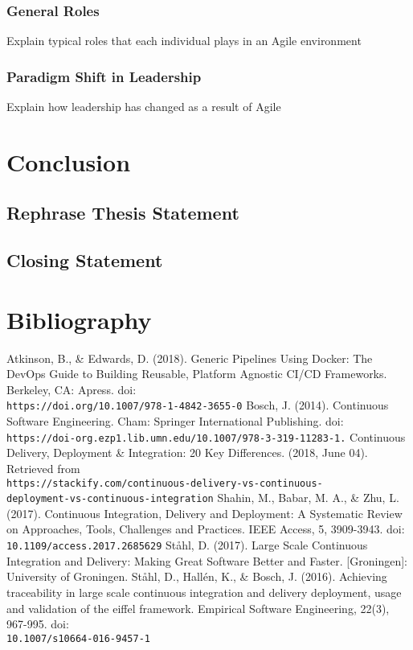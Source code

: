 \documentclass[11pt,a4paper]{article}
\begin{document}
		\subsubsection{General Roles}
		Explain typical roles that each individual plays in an Agile environment
		\subsubsection{Paradigm Shift in Leadership}
		Explain how leadership has changed as a result of Agile

\section{Conclusion}
	\subsection{Rephrase Thesis Statement}
	\subsection{Closing Statement}

\newpage
\section{Bibliography}
\begin{thebibliography}{6}
	 Atkinson, B., \& Edwards, D. (2018). Generic Pipelines Using Docker: The DevOps Guide to Building Reusable, Platform Agnostic CI/CD Frameworks. Berkeley, CA: Apress. doi:\\\texttt{https://doi.org/10.1007/978-1-4842-3655-0}
	 Bosch, J. (2014). Continuous Software Engineering. Cham: Springer International Publishing. doi:\\\texttt{https://doi-org.ezp1.lib.umn.edu/10.1007/978-3-319-11283-1.}
	 Continuous Delivery, Deployment \& Integration: 20 Key Differences. (2018, June 04). Retrieved from \\\texttt{https://stackify.com/continuous-delivery-vs-continuous-\\deployment-vs-continuous-integration}
	 Shahin, M., Babar, M. A., \& Zhu, L. (2017). Continuous Integration, Delivery and Deployment: A Systematic Review on Approaches, Tools, Challenges and Practices. IEEE Access, 5, 3909-3943. doi:\\\texttt{10.1109/access.2017.2685629}
	 St\aa hl, D. (2017). Large Scale Continuous Integration and Delivery: Making Great Software Better and Faster. [Groningen]: University of Groningen.
	 St\aa hl, D., Hall\'{e}n, K., \& Bosch, J. (2016). Achieving traceability in large scale continuous integration and delivery deployment, usage and validation of the eiffel framework. Empirical Software Engineering, 22(3), 967-995. doi:\\\texttt{10.1007/s10664-016-9457-1}
\end{thebibliography}
\end{document}
